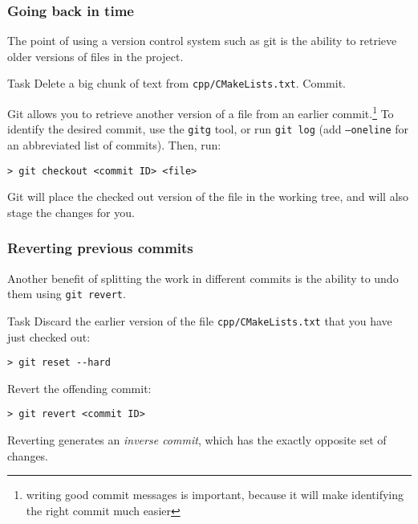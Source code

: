 \begin{frame}[fragile]

\frametitle{Going back in time}

The point of using a version control system such as git is the ability to retrieve older versions of files in the project.

	\begin{block}{Task}
	Delete a big chunk of text from \texttt{cpp/CMakeLists.txt}. Commit.
	\end{block}
	
	Git allows you to retrieve another version of a file from an earlier commit.\footnote{writing good commit messages is important, because it will make identifying \\the right commit much easier} To identify the desired commit, use the \texttt{gitg} tool, or run \texttt{git log} (add \texttt{--oneline} for an abbreviated list of commits). Then, run:
	\begin{verbatim}
> git checkout <commit ID> <file>
	\end{verbatim}
	Git will place the checked out version of the file in the working tree, and will also stage the changes for you.
\end{frame}


\begin{frame}[fragile]

\frametitle{Reverting previous commits}

Another benefit of splitting the work in different commits is the ability to undo them using \texttt{git revert}.

	\begin{block}{Task}
	Discard the earlier version of the file \texttt{cpp/CMakeLists.txt} that you have just checked out:
	\begin{verbatim}
> git reset --hard
	\end{verbatim}

	Revert the offending commit:
	\begin{verbatim}
> git revert <commit ID>
	\end{verbatim}

Reverting generates an \textit{inverse commit}, which has the exactly opposite set of changes.
	\end{block}

\end{frame}

